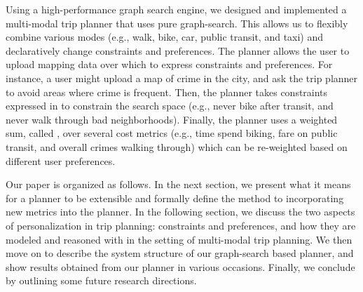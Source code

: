 Using a high-performance graph search
engine\cite{zhou2011dynamic}, we designed and implemented a 
multi-modal trip planner that uses pure
graph-search. This allows us to flexibly combine various modes
(e.g., walk, bike, car, public transit, and taxi) and 
declaratively change constraints and preferences. 
The planner allows the user
to upload  mapping data over which to express
constraints and preferences.  For instance, a user might upload a map of crime
in the city, and ask the trip planner to avoid areas where crime is frequent.
Then, the planner takes constraints expressed in  to constrain the search space (e.g., never bike after
transit, and never walk through bad neighborhoods).
Finally, the planner uses a weighted sum, called , 
over several cost metrics (e.g., time spend biking, fare on public transit, 
and overall crimes walking through) which can be re-weighted based
on different user preferences. 

Our paper is organized as follows.
In the next section, we present what it means for a planner to be extensible
and formally define the method to incorporating new metrics into the planner.
In the following section, we discuss the two aspects of personalization
in trip planning: constraints and preferences, and how they are modeled and
reasoned with in the setting of multi-modal trip planning.
We then move on to describe the system structure of our graph-search based planner,
and show results obtained from our planner in various occasions.
Finally, we conclude by outlining some future research directions.

